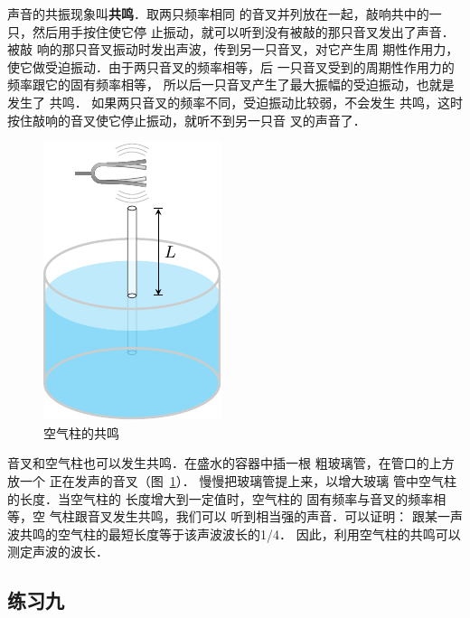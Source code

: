 声音的共振现象叫\textbf{共鸣}．取两只频率相同
的音叉并列放在一起，敲响共中的一只，然后用手按住使它停
止振动，就可以听到没有被敲的那只音叉发出了声音．被敲
响的那只音叉振动时发出声波，传到另一只音叉，对它产生周
期性作用力，使它做受迫振动．由于两只音叉的频率相等，后
一只音叉受到的周期性作用力的频率跟它的固有频率相等，
所以后一只音叉产生了最大振幅的受迫振动，也就是发生了
共鸣．
如果两只音叉的频率不同，受迫振动比较弱，不会发生
共鸣，这时按住敲响的音叉使它停止振动，就听不到另一只音
叉的声音了．
\begin{figure}[htbp]
    \centering
    \includegraphics{fig/A/9-29.pdf}
    \caption{空气柱的共鸣}\label{fig_A_9-29}
\end{figure}

音叉和空气柱也可以发生共鸣．在盛水的容器中插一根
粗玻璃管，在管口的上方放一个
正在发声的音叉（图~\ref{fig_A_9-29}）．
慢慢把玻璃管提上来，以增大玻璃
管中空气柱的长度．当空气柱的
长度增大到一定值时，空气柱的
固有频率与音叉的频率相等，空
气柱跟音叉发生共鸣，我们可以
听到相当强的声音．可以证明：
跟某一声波共鸣的空气柱的最短长度等于该声波波长的1/4．
因此，利用空气柱的共鸣可以测定声波的波长．


\subsection*{练习九}

